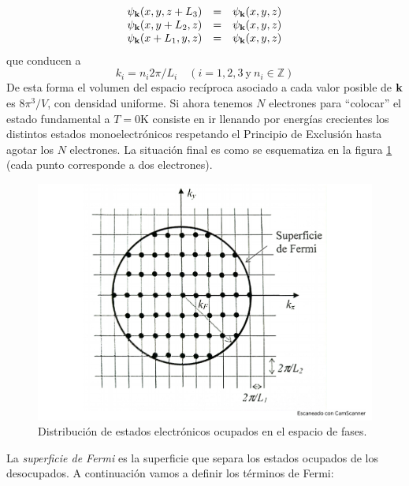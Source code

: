 \begin{equation}
    \begin{array}{ccc}
    \psi_{\mathbf{k}} (x,y,z+L_3) & = & \psi_{\mathbf{k}} (x,y,z) \\
    \psi_{\mathbf{k}} (x,y+L_2,z) & = & \psi_{\mathbf{k}} (x,y,z) \\
    \psi_{\mathbf{k}} (x+L_1,y,z) & = & \psi_{\mathbf{k}} (x,y,z) \\
    \end{array}
\end{equation}
que conducen a 
\begin{equation}
    k_i = n_i 2 \pi / L_i \quad (i=1,2,3 \ \text{y} \ n_i \in \mathbb{Z})
\end{equation}
De esta forma el volumen del espacio recíproca asociado a cada valor posible de $\mathbf{k}$ es $8\pi^3 /V$, con densidad uniforme. Si ahora tenemos $N$ electrones para ``colocar'' el estado fundamental a $T=0$K consiste en ir llenando por energías crecientes los distintos estados monoelectrónicos respetando el Principio de Exclusión hasta agotar los $N$ electrones. La situación final es como se esquematiza en la figura \ref{Fig:06-01} (cada punto corresponde a dos electrones).

\begin{figure}[h!] \centering
    \includegraphics[scale=0.35]{Cuerpo/Ch_06/Fotos libro 1.pdf}
    \caption{Distribución de estados electrónicos ocupados en el espacio de fases.}
    \label{Fig:06-01}
\end{figure}    



La \textit{superficie de Fermi} es la superficie que separa los estados ocupados de los desocupados. A continuación vamos a definir los términos de Fermi:

